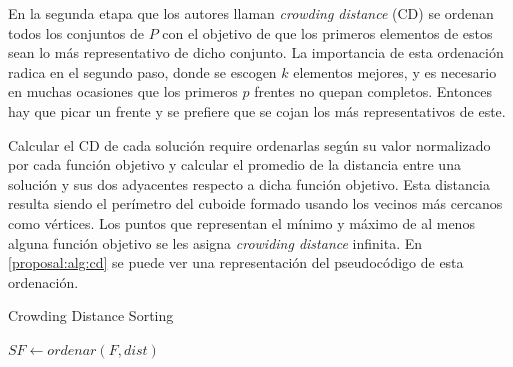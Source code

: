 En la segunda etapa que los autores llaman \textit{crowding distance} (CD) se ordenan todos los conjuntos de $P$ con el objetivo de que los primeros elementos de estos sean lo m\'as representativo de dicho conjunto. La importancia de esta ordenaci\'on radica en el segundo paso, donde se escogen $k$ elementos mejores, y es necesario en muchas ocasiones que los primeros $p$ frentes no quepan completos. Entonces hay que picar un frente y se prefiere que se cojan los m\'as representativos de este.


Calcular el CD de cada soluci\'on require ordenarlas seg\'un su valor normalizado por cada funci\'on objetivo y calcular el promedio de la distancia entre una soluci\'on y sus dos adyacentes respecto a dicha funci\'on objetivo. Esta distancia resulta siendo el per\'imetro del cuboide formado usando los vecinos m\'as cercanos como v\'ertices. Los puntos que representan el m\'inimo y m\'aximo de al menos alguna funci\'on objetivo se les asigna \textit{crowiding distance} infinita. En \ref{proposal:alg:cd} se puede ver una representaci\'on del pseudoc\'odigo de esta ordenaci\'on.

\begin{algorithm*}[ht]
    \caption{Crowding Distance Sorting}
    \label{proposal:alg:cd}


    $SF \gets ordenar(F, dist)$ 
\end{algorithm*}


